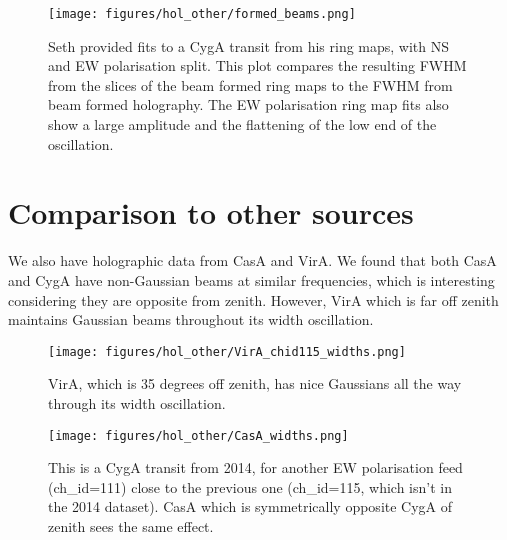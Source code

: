\begin{figure}[h!]
\texttt{[image: figures/hol\_other/formed\_beams.png]}


\caption{Seth provided fits to a CygA transit from his ring maps, with NS and EW polarisation split. This plot compares the resulting FWHM from the slices of the beam formed ring maps to the FWHM from beam formed holography. The EW polarisation ring map fits also show a large amplitude and the flattening of the low end of the oscillation.}
\label{formed_beams}
\end{figure}
 
\newpage

\section{Comparison to other sources}\label{othersources}

We also have holographic data from CasA and VirA. We found that both CasA and CygA have non-Gaussian beams at similar frequencies, which is interesting considering they are opposite from zenith. However, VirA which is far off zenith maintains Gaussian beams throughout its width oscillation.


\begin{figure}[h!]
\texttt{[image: figures/hol\_other/VirA\_chid115\_widths.png]}
\caption{VirA, which is 35 degrees off zenith, has nice Gaussians all the way through its width oscillation.}
\label{vira}
\end{figure} 


\begin{figure}[h!]
\texttt{[image: figures/hol\_other/CasA\_widths.png]}
\caption{This is a CygA transit from 2014, for another EW polarisation feed (ch\_id=111) close to the previous one (ch\_id=115, which isn't in the 2014 dataset). CasA which is symmetrically opposite CygA of zenith sees the same effect.}
\label{casa}
\end{figure} 

